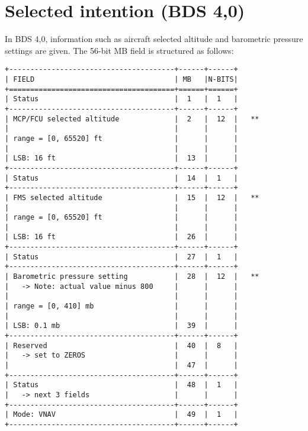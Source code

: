 \section{Selected intention (BDS 4,0)}\label{selected-intention-bds-40}

In BDS 4,0, information such as aircraft selected altitude and
barometric pressure settings are given. The 56-bit MB field is
structured as follows:

\begin{verbatim}
+---------------------------------------+------+------+
| FIELD                                 | MB   |N-BITS|
+=======================================+======+======+
| Status                                |  1   |  1   |
+---------------------------------------+------+------+
| MCP/FCU selected altitude             |  2   |  12  |   **
|                                       |      |      |
| range = [0, 65520] ft                 |      |      |
|                                       |      |      |
| LSB: 16 ft                            |  13  |      |
+---------------------------------------+------+------+
| Status                                |  14  |  1   |
+---------------------------------------+------+------+
| FMS selected altitude                 |  15  |  12  |   **
|                                       |      |      |
| range = [0, 65520] ft                 |      |      |
|                                       |      |      |
| LSB: 16 ft                            |  26  |      |
+---------------------------------------+------+------+
| Status                                |  27  |  1   |
+---------------------------------------+------+------+
| Barometric pressure setting           |  28  |  12  |   **
|   -> Note: actual value minus 800     |      |      |
|                                       |      |      |
| range = [0, 410] mb                   |      |      |
|                                       |      |      |
| LSB: 0.1 mb                           |  39  |      |
+---------------------------------------+------+------+
| Reserved                              |  40  |  8   |
|   -> set to ZEROS                     |      |      |
|                                       |  47  |      |
+---------------------------------------+------+------+
| Status                                |  48  |  1   |
|   -> next 3 fields                    |      |      |
+---------------------------------------+------+------+
| Mode: VNAV                            |  49  |  1   |
+---------------------------------------+------+------+

\end{verbatim}
